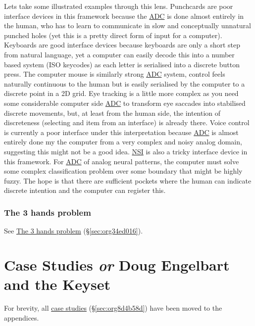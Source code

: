 \documentclass[logo,bsc,singlespacing,parskip]{infthesis}
\begin{document}
Lets take some illustrated examples through this lens.
Punchcards are poor interface devices in this framework because the \hyperref[org146c745]{ADC} is done almost entirely in the human, who has to learn to communicate in slow and conceptually unnatural punched holes (yet this is a pretty direct form of input for a computer).
Keyboards are good interface devices because keyboards are only a short step from natural language, yet a computer can easily decode this into a number based system (ISO keycodes) as each letter is serialised into a discrete button press.
The computer mouse is similarly strong \hyperref[org146c745]{ADC} system, control feels naturally continuous to the human but is easily serialised by the computer to a discrete point in a 2D grid.
Eye tracking is a little more complex as you need some considerable computer side \hyperref[org146c745]{ADC} to transform eye saccades into stabilised discrete movements, but, at least from the human side, the intention of discreteness (selecting and item from an interface) is already there.
Voice control is currently a poor interface under this interpretation because \hyperref[org146c745]{ADC} is almost entirely done my the computer from a very complex and noisy analog domain, suggesting this might not be a good idea.
\hyperref[orgbcfe20a]{NSI} is also a tricky interface device in this framework.
For \hyperref[org146c745]{ADC} of analog neural patterns, the computer must solve some complex classification problem over some boundary that might be highly fuzzy.
The hope is that there are sufficient pockets where the human can indicate discrete intention and the computer can register this.

\section{The 3 hands problem}
\label{sec:org8f1280c}
See \hyperref[sec:org34ed016]{The 3 hands problem} (\S \ref{sec:org34ed016}).

\part{Case Studies \emph{or} Doug Engelbart and the Keyset}
\label{sec:orgccce030}
For brevity, all \hyperref[sec:org8d4b58d]{case studies} (\S \ref{sec:org8d4b58d}) have been moved to the appendices.
\end{document}
